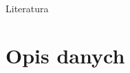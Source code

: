 \documentclass{beamer}
\begin{document}
\begin{frame}{Literatura}

\small



\end{frame}


\section{Opis danych}







\end{document}
